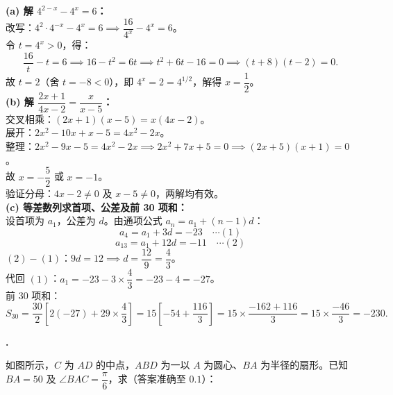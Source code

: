 \documentclass[12pt,a4paper]{ctexart}
\newcounter{qnum}
\newenvironment{question}
  {%
    \stepcounter{qnum}%
    \vspace{0.8em}%
    \noindent\textbf{\theqnum.}\enspace
  }
  {\par\vspace{0.4em}}
\newenvironment{solution}
  {%
    \par\noindent
  }
  {\par}
\begin{document}
\begin{solution}
    \textbf{(a) 解 $4^{2-x} - 4^x = 6$：} \\
    改写：$4^2 \cdot 4^{-x} - 4^x = 6 \implies \dfrac{16}{4^x} - 4^x = 6$。\\
    令 $t = 4^x > 0$，得：
    \[
        \frac{16}{t} - t = 6 \implies 16 - t^2 = 6t \implies t^2 + 6t - 16 = 0 \implies (t+8)(t-2) = 0.
    \]
    故 $t = 2$（舍 $t = -8 < 0$），即 $4^x = 2 = 4^{1/2}$，解得 $x = \dfrac{1}{2}$。\\

    \textbf{(b) 解 $\dfrac{2x+1}{4x-2} = \dfrac{x}{x-5}$：} \\
    交叉相乘：$(2x+1)(x-5) = x(4x-2)$。\\
    展开：$2x^2 - 10x + x - 5 = 4x^2 - 2x$。\\
    整理：$2x^2 - 9x - 5 = 4x^2 - 2x \implies 2x^2 + 7x + 5 = 0 \implies (2x+5)(x+1) = 0$。\\
    故 $x = -\dfrac{5}{2}$ 或 $x = -1$。\\
    验证分母：$4x-2 \ne 0$ 及 $x-5 \ne 0$，两解均有效。\\

    \textbf{(c) 等差数列求首项、公差及前 30 项和：} \\
    设首项为 $a_1$，公差为 $d$。由通项公式 $a_n = a_1 + (n-1)d$：
    \[
        a_4 = a_1 + 3d = -23 \quad\cdots(1)
    \]
    \[
        a_{13} = a_1 + 12d = -11 \quad\cdots(2)
    \]
    $(2)-(1)$：$9d = 12 \implies d = \dfrac{12}{9} = \dfrac{4}{3}$。\\
    代回 $(1)$：$a_1 = -23 - 3\times\dfrac{4}{3} = -23 - 4 = -27$。\\
    前 30 项和：
    \[
        S_{30} = \frac{30}{2}\left[2(-27) + 29\times\frac{4}{3}\right]
        = 15\left[-54 + \frac{116}{3}\right]
        = 15\times\frac{-162+116}{3}
        = 15\times\frac{-46}{3}
        = -230.
    \]
\end{solution}

\begin{question}
    如图所示，$C$ 为 $AD$ 的中点，$ABD$ 为一以 $A$ 为圆心、$BA$ 为半径的扇形。已知 $BA = 50$ 及 $\angle BAC = \dfrac{\pi}{6}$，求（答案准确至 $0.1$）：
\end{question}
\end{document}
